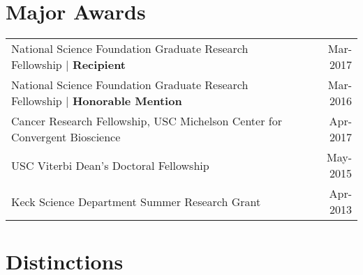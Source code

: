 \documentclass[10pt,a4paper]{article}
\begin{document}
  \vspace*{2mm}\section*{Major Awards}
  \vspace*{1mm}\noindent\begin{tabularx}{17cm}{X r}
    National Science Foundation Graduate Research Fellowship | \textbf{Recipient} & Mar-2017 \\
    National Science Foundation Graduate Research Fellowship | \textbf{Honorable Mention} & Mar-2016 \\
    Cancer Research Fellowship, USC Michelson Center for Convergent Bioscience & Apr-2017 \\ %
    USC Viterbi Dean's Doctoral Fellowship & May-2015 \\
    Keck Science Department Summer Research Grant & Apr-2013 \\%
  \end{tabularx}

  \vspace*{2mm}\section*{Distinctions}
  
\end{document}
